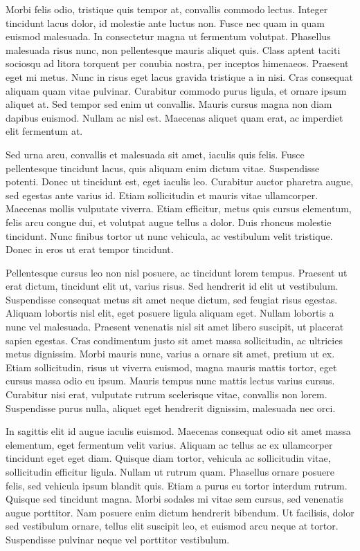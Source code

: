 Morbi felis odio, tristique quis tempor at, convallis commodo lectus. Integer tincidunt lacus dolor, id molestie ante luctus non. Fusce nec quam in quam euismod malesuada. In consectetur magna ut fermentum volutpat. Phasellus malesuada risus nunc, non pellentesque mauris aliquet quis. Class aptent taciti sociosqu ad litora torquent per conubia nostra, per inceptos himenaeos. Praesent eget mi metus. Nunc in risus eget lacus gravida tristique a in nisi. Cras consequat aliquam quam vitae pulvinar. Curabitur commodo purus ligula, et ornare ipsum aliquet at. Sed tempor sed enim ut convallis. Mauris cursus magna non diam dapibus euismod. Nullam ac nisl est. Maecenas aliquet quam erat, ac imperdiet elit fermentum at.

Sed urna arcu, convallis et malesuada sit amet, iaculis quis felis. Fusce pellentesque tincidunt lacus, quis aliquam enim dictum vitae. Suspendisse potenti. Donec ut tincidunt est, eget iaculis leo. Curabitur auctor pharetra augue, sed egestas ante varius id. Etiam sollicitudin et mauris vitae ullamcorper. Maecenas mollis vulputate viverra. Etiam efficitur, metus quis cursus elementum, felis arcu congue dui, et volutpat augue tellus a dolor. Duis rhoncus molestie tincidunt. Nunc finibus tortor ut nunc vehicula, ac vestibulum velit tristique. Donec in eros ut erat tempor tincidunt.

Pellentesque cursus leo non nisl posuere, ac tincidunt lorem tempus. Praesent ut erat dictum, tincidunt elit ut, varius risus. Sed hendrerit id elit ut vestibulum. Suspendisse consequat metus sit amet neque dictum, sed feugiat risus egestas. Aliquam lobortis nisl elit, eget posuere ligula aliquam eget. Nullam lobortis a nunc vel malesuada. Praesent venenatis nisl sit amet libero suscipit, ut placerat sapien egestas. Cras condimentum justo sit amet massa sollicitudin, ac ultricies metus dignissim. Morbi mauris nunc, varius a ornare sit amet, pretium ut ex. Etiam sollicitudin, risus ut viverra euismod, magna mauris mattis tortor, eget cursus massa odio eu ipsum. Mauris tempus nunc mattis lectus varius cursus. Curabitur nisi erat, vulputate rutrum scelerisque vitae, convallis non lorem. Suspendisse purus nulla, aliquet eget hendrerit dignissim, malesuada nec orci.

In sagittis elit id augue iaculis euismod. Maecenas consequat odio sit amet massa elementum, eget fermentum velit varius. Aliquam ac tellus ac ex ullamcorper tincidunt eget eget diam. Quisque diam tortor, vehicula ac sollicitudin vitae, sollicitudin efficitur ligula. Nullam ut rutrum quam. Phasellus ornare posuere felis, sed vehicula ipsum blandit quis. Etiam a purus eu tortor interdum rutrum. Quisque sed tincidunt magna. Morbi sodales mi vitae sem cursus, sed venenatis augue porttitor. Nam posuere enim dictum hendrerit bibendum. Ut facilisis, dolor sed vestibulum ornare, tellus elit suscipit leo, et euismod arcu neque at tortor. Suspendisse pulvinar neque vel porttitor vestibulum.

